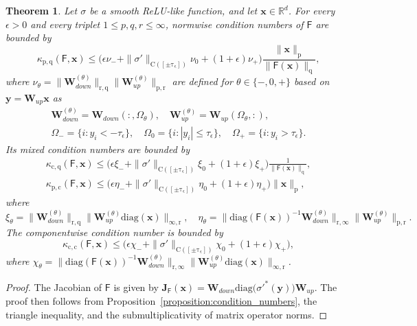 \documentclass[namedate,webpdf,imanum]{ima-authoring-template}
\newcommand{\Real}{\mathbb{R}}
\newcommand{\Matrix}[1]{\mathbf{#1}}
\newcommand{\diag}[2][]{\mathrm{diag}#1( #2 #1)}
\newcommand{\Norm}[3][]{#1\| #2 #1\|_{\mathrm{#3}}}
\newcommand{\Layer}[1]{\mathsf{#1}}
\newcommand{\cond}[3][]{\kappa_{\mathrm{#2}} #1( #3 #1)}
\newcommand{\set}[3][]{#1\{ #2 : #3 #1\}}
\newtheorem{theorem}{Theorem}[section]%
\numberwithin{equation}{section}
\begin{document}
\begin{theorem}
\label{theorem:cond-ffn-gelu}
Let $\sigma$ be a smooth ReLU-like function, and let $\Matrix{x} \in \Real^d$.
For every $\epsilon > 0$ and every triplet $1 \leq p,q,r \leq \infty$, normwise condition numbers of $\Layer{F}$ are bounded by
\begin{equation*}
    \cond{p,q}{\Layer{F}, \Matrix{x}} \leq \Big( \epsilon \nu_{-} + \Norm{\sigma'}{C([\pm \tau_{\epsilon}])} \nu_{0} + (1 + \epsilon) \nu_{+} \Big) \frac{\Norm{\Matrix{x}}{p}}{\Norm{\Layer{F}(\Matrix{x})}{q}},
\end{equation*}
where $\nu_{\theta} = \Norm{\Matrix{W}_{down}^{(\theta)}}{r,q} \Norm{\Matrix{W}_{up}^{(\theta)}}{p,r}$ are defined for $\theta \in \{ -, 0, + \}$ based on $\Matrix{y} = \Matrix{W}_{up} \Matrix{x}$ as
\begin{gather*}
    \Matrix{W}_{down}^{(\theta)} = \Matrix{W}_{down}(:, \Omega_{\theta}), \quad \Matrix{W}_{up}^{(\theta)} = \Matrix{W}_{up}(\Omega_{\theta}, :), \\
    \Omega_{-} = \set{i}{y_i < -\tau_{\epsilon}}, \quad \Omega_{0} = \set{i}{|y_i| \leq \tau_{\epsilon}}, \quad \Omega_{+} = \set{i}{y_i > \tau_{\epsilon}}.
\end{gather*}
Its mixed condition numbers are bounded by
\begin{gather*}
    \cond{c,q}{\Layer{F}, \Matrix{x}} \leq \Big( \epsilon \xi_{-} + \Norm{\sigma'}{C([\pm \tau_{\epsilon}])} \xi_{0} + (1 + \epsilon) \xi_{+} \Big) \frac{1}{\Norm{\Layer{F}(\Matrix{x})}{q}}, \\
    \cond{p,c}{\Layer{F}, \Matrix{x}} \leq \Big( \epsilon \eta_{-} + \Norm{\sigma'}{C([\pm \tau_{\epsilon}])} \eta_{0} + (1 + \epsilon) \eta_{+} \Big) \Norm{\Matrix{x}}{p},
\end{gather*}
where
\begin{equation*}
    \xi_{\theta} = \Norm{\Matrix{W}_{down}^{(\theta)}}{r,q} \Norm{\Matrix{W}_{up}^{(\theta)} \diag{\Matrix{x}}}{\infty,r}, \quad \eta_{\theta} = \Norm{\diag{\Layer{F}(\Matrix{x})}^{-1} \Matrix{W}_{down}^{(\theta)}}{r,\infty} \Norm{\Matrix{W}_{up}^{(\theta)}}{p,r}.
\end{equation*}
The componentwise condition number is bounded by
\begin{equation*}
    \cond{c,c}{\Layer{F}, \Matrix{x}} \leq \Big( \epsilon \chi_{-} + \Norm{\sigma'}{C([\pm \tau_{\epsilon}])} \chi_{0} + (1 + \epsilon) \chi_{+} \Big),
\end{equation*}
where $\chi_{\theta} = \Norm{\diag{\Layer{F}(\Matrix{x})}^{-1} \Matrix{W}_{down}^{(\theta)}}{r,\infty} \Norm{\Matrix{W}_{up}^{(\theta)} \diag{\Matrix{x}}}{\infty,r}$.
\end{theorem}
\begin{proof}
The Jacobian of $\Layer{F}$ is given by $\Matrix{J}_{\Layer{F}}(\Matrix{x}) = \Matrix{W}_{down} \diag[\big]{{\sigma'}^{\ast}(\Matrix{y})} \Matrix{W}_{up}$.
The proof then follows from Proposition~\ref{proposition:condition_numbers}, the triangle inequality, and the submultiplicativity of matrix operator norms.
\end{proof}
\end{document}
